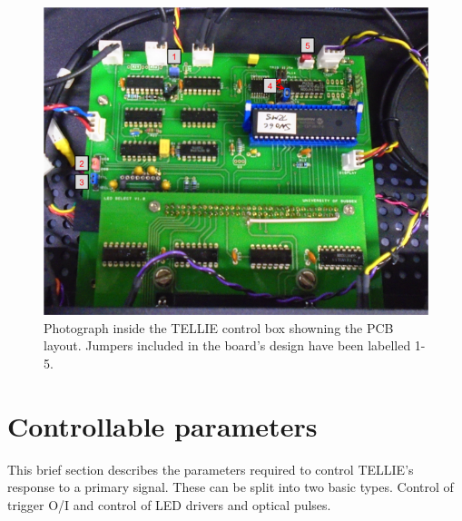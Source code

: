 \documentclass[12pt]{report}
\begin{document}
\begin{figure}[htbp]
	\begin{center}
		\includegraphics[width=1.0\textwidth]{ControlBoardInside}
		\caption{Photograph inside the TELLIE control box showning the PCB layout. Jumpers included in the board's design have been labelled 1-5.}
		\label{fig:ControlBoard}
	\end{center}
\end{figure}


\section{Controllable parameters}
This brief section describes the parameters required to control TELLIE's response to a primary signal. These can be split into two basic types. Control of trigger O/I and control of LED drivers and optical pulses. 
\end{document}
